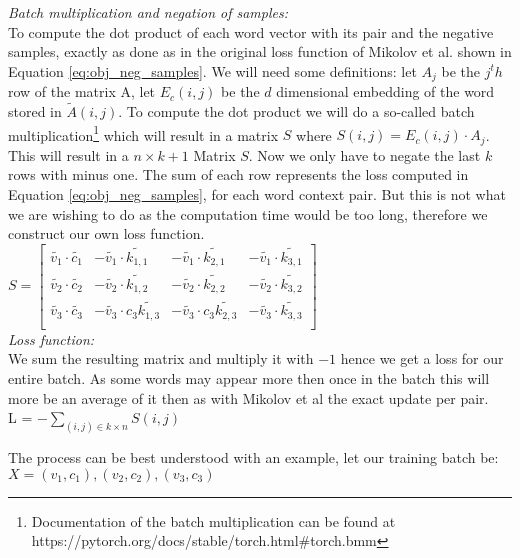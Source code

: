  \textit{Batch multiplication and negation of samples:}\\ 
 To compute the dot product of each word vector with its pair and the negative samples, exactly as done as in the original loss function of Mikolov et al. shown in Equation \ref{eq:obj_neg_samples}. We will need some definitions: let $A_j$ be the $j^th$ row of the matrix A, let $E_c(i,j)$ be the $d$ dimensional embedding of the word stored in $\tilde{A}(i,j)$. To compute the dot product we will do a so-called batch multiplication\footnote{Documentation of the batch multiplication  can be found at https://pytorch.org/docs/stable/torch.html\#torch.bmm} which will result in a matrix $S$ where $S(i,j) = E_c(i,j) \cdot A_j$. This will result in a $n\times k+1$ Matrix $S$. Now we only have to negate the last $k$ rows with minus one. The sum of each row represents the loss computed in Equation \ref{eq:obj_neg_samples}, for each word context pair.
  But this is not what we are wishing to do as the computation time would be too long, therefore we construct our own loss function. \\
  $S = \begin{bmatrix}
\tilde{v_1} \cdot  \tilde{c_1} & -\tilde{v_1} \cdot \tilde{k_{1,1}} & -\tilde{v_1} \cdot  \tilde{k_{2,1}}& -\tilde{v_1} \cdot  \tilde{k_{3,1}}\\
\tilde{v_2} \cdot \tilde{c_2} & -\tilde{v_2} \cdot \tilde{k_{1,2}} & -\tilde{v_2} \cdot \tilde{k_{2,2}} & -\tilde{v_2} \cdot \tilde{k_{3,2}}\\
\tilde{v_3} \cdot \tilde{c_3} &-\tilde{v_3} \cdot c_3  \tilde{k_{1,3}} & -\tilde{v_3} \cdot c_3 \tilde{k_{2,3}}&-\tilde{v_3} \cdot \tilde{k_{3,3}}\\
\end{bmatrix}$\\

\textit{Loss function:}\\
We sum the resulting matrix and multiply it with $-1$  hence we get a loss for our entire batch. As some words may appear more then once in the batch this will more be an average of it then as with Mikolov et al the exact update per pair. \\
 L = $- \sum_{(i,j) \in k \times n} S(i,j) $

The process can be best understood with an example, let our training batch be:\\ $X = {(v_1,c_1),(v_2,c_2),(v_3,c_3)}$

